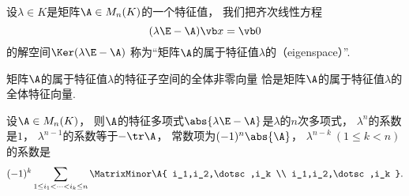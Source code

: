 \begin{definition}
设\(\lambda \in K\)是矩阵\(\A \in M_n(K)\)的一个特征值，
我们把齐次线性方程\[
	(\lambda\E-\A)\x=\vb0
\]的解空间\(\Ker(\lambda\E-\A)\)
称为“矩阵\(\A\)的属于特征值\(\lambda\)的（eigenspace）”.
\end{definition}

\begin{proposition}
矩阵\(\A\)的属于特征值\(\lambda\)的特征子空间的全体非零向量
恰是矩阵\(\A\)的属于特征值\(\lambda\)的全体特征向量.
\end{proposition}

\begin{proposition}
设\(\A \in M_n(K)\)，
则\(\A\)的特征多项式\(\abs{\lambda\E-\A}\)是\(\lambda\)的\(n\)次多项式，
\(\lambda^n\)的系数是\(1\)，
\(\lambda^{n-1}\)的系数等于\(-\tr\A\)，
常数项为\((-1)^n \abs{\A}\)，
\(\lambda^{n-k}\ (1\leq k<n)\)的系数是\[
	(-1)^k \sum_{1 \leq i_1 < \dotsb < i_k \leq n} \MatrixMinor\A{
		i_1,i_2,\dotsc,i_k \\
		i_1,i_2,\dotsc,i_k
	}.
\]
\end{proposition}

